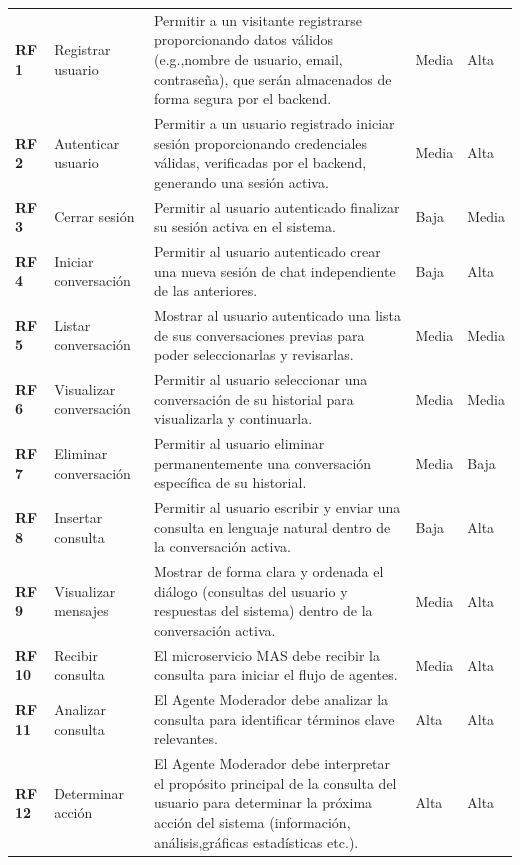 \begin{longtable}{@{}l >{\raggedright\arraybackslash}p{4.5cm} >{\raggedright\arraybackslash}p{6.5cm} l l@{}}
	\textbf{RF 1} & Registrar usuario & Permitir a un visitante registrarse proporcionando datos válidos (e.g.,nombre de usuario, email, contraseña), que serán almacenados de forma segura por el backend. & Media & Alta \\ 
	\textbf{RF 2} & Autenticar usuario & Permitir a un usuario registrado iniciar sesión proporcionando credenciales válidas, verificadas por el backend, generando una sesión activa. & Media & Alta \\ 
	\textbf{RF 3} & Cerrar sesión & Permitir al usuario autenticado finalizar su sesión activa en el sistema. & Baja & Media \\ 
	\textbf{RF 4} & Iniciar conversación & Permitir al usuario autenticado crear una nueva sesión de chat independiente de las anteriores. & Baja & Alta \\ %
	\textbf{RF 5} & Listar conversación & Mostrar al usuario autenticado una lista de sus conversaciones previas para poder seleccionarlas y revisarlas. & Media & Media \\ %
	\textbf{RF 6} & Visualizar conversación & Permitir al usuario seleccionar una conversación de su historial para visualizarla y continuarla. & Media & Media \\ %
	\textbf{RF 7} & Eliminar conversación & Permitir al usuario eliminar permanentemente una conversación específica de su historial. & Media & Baja \\ 
	\textbf{RF 8} & Insertar consulta & Permitir al usuario escribir y enviar una consulta en lenguaje natural dentro de la conversación activa. & Baja & Alta \\ 
	\textbf{RF 9} & Visualizar mensajes & Mostrar de forma clara y ordenada el diálogo (consultas del usuario y respuestas del sistema) dentro de la conversación activa. & Media & Alta \\  
	\textbf{RF 10} & Recibir consulta & El microservicio MAS debe recibir la consulta para iniciar el flujo de agentes. & Media & Alta \\ 
	\textbf{RF 11} & Analizar consulta & El Agente Moderador debe analizar la consulta para identificar términos clave relevantes. & Alta & Alta \\ 
	\textbf{RF 12} & Determinar acción & El Agente Moderador debe interpretar el propósito principal de la consulta del usuario para determinar la próxima acción del sistema (información, análisis,gráficas estadísticas etc.). & Alta & Alta \\ 

\end{longtable}

